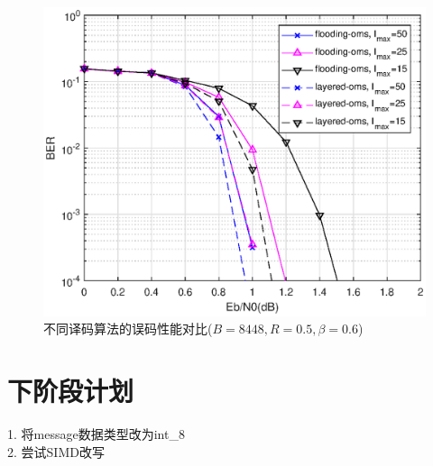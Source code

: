 \documentclass{article}
\begin{document}
\begin{figure}[H]
	\centering
	\includegraphics[width = \textwidth]{fig_r12_K8448LImax.eps}
	\caption{{不同译码算法的误码性能对比($B=8448,R=0.5,\beta=0.6$)}}
\end{figure}








\section{下阶段计划}
1. 将message数据类型改为int\_8\\
2. 尝试SIMD改写
\end{document}
